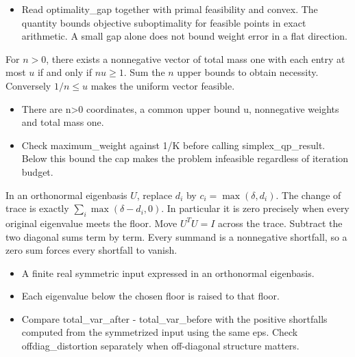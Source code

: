 \expandafter\def\csname statadic@diagnostics@STATADIC-SIMPLEX-002\endcsname{\begin{itemize}
\item Read optimality\_gap together with primal feasibility and convex. The quantity bounds objective suboptimality for feasible points in exact arithmetic. A small gap alone does not bound weight error in a flat direction.
\end{itemize}}
\expandafter\def\csname statadic@statement@STATADIC-SIMPLEX-003\endcsname{For $n>0$, there exists a nonnegative vector of total mass
  one with each entry at most $u$ if and only if $nu\ge1$.}
\expandafter\def\csname statadic@proof@STATADIC-SIMPLEX-003\endcsname{Sum the $n$ upper bounds to obtain necessity.
  Conversely $1/n\le u$ makes the uniform vector feasible.}
\expandafter\def\csname statadic@assumptions@STATADIC-SIMPLEX-003\endcsname{\begin{itemize}
\item There are n>0 coordinates, a common upper bound u, nonnegative weights and total mass one.
\end{itemize}}
\expandafter\def\csname statadic@diagnostics@STATADIC-SIMPLEX-003\endcsname{\begin{itemize}
\item Check maximum\_weight against 1/K before calling simplex\_qp\_result. Below this bound the cap makes the problem infeasible regardless of iteration budget.
\end{itemize}}
\expandafter\def\csname statadic@statement@STATADIC-PSD-001\endcsname{In an orthonormal eigenbasis $U$, replace $d_i$ by
  $c_i=\max(\delta,d_i)$. The change of trace is exactly
  $\sum_i\max(\delta-d_i,0)$. In particular it is zero precisely when every
  original eigenvalue meets the floor.}
\expandafter\def\csname statadic@proof@STATADIC-PSD-001\endcsname{Move $U^TU=I$ across the trace. Subtract the two diagonal
  sums term by term. Every summand is a nonnegative shortfall, so a zero sum
  forces every shortfall to vanish.}
\expandafter\def\csname statadic@assumptions@STATADIC-PSD-001\endcsname{\begin{itemize}
\item A finite real symmetric input expressed in an orthonormal eigenbasis.
\item Each eigenvalue below the chosen floor is raised to that floor.
\end{itemize}}
\expandafter\def\csname statadic@diagnostics@STATADIC-PSD-001\endcsname{\begin{itemize}
\item Compare total\_var\_after - total\_var\_before with the positive shortfalls computed from the symmetrized input using the same eps. Check offdiag\_distortion separately when off-diagonal structure matters.
\end{itemize}}
